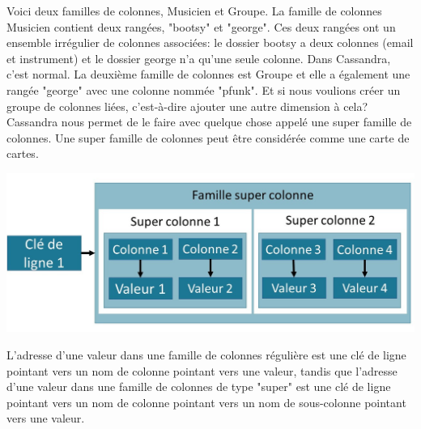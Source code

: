\documentclass[12pt, letterpaper]{report}
\begin{document}
Voici deux familles de colonnes, Musicien et Groupe. La famille de colonnes Musicien contient deux rangées, "bootsy" et "george". Ces deux rangées ont un ensemble irrégulier de colonnes associées: le dossier bootsy a deux colonnes (email et instrument) et le dossier george n'a qu'une seule colonne. Dans Cassandra, c'est normal. La deuxième famille de colonnes est Groupe et elle a également une rangée "george" avec une colonne nommée "pfunk".
\newline
Et si nous voulions créer un groupe de colonnes liées, c'est-à-dire ajouter une autre dimension à cela? Cassandra nous permet de le faire avec quelque chose appelé une super famille de colonnes. Une super famille de colonnes peut être considérée comme une carte de cartes.

\begin{center}
	\includegraphics[width=\textwidth]{supercolumnfam}
\end{center}

L'adresse d'une valeur dans une famille de colonnes régulière est une clé de ligne pointant vers un nom de colonne pointant vers une valeur, tandis que l'adresse d'une valeur dans une famille de colonnes de type "super" est une clé de ligne pointant vers un nom de colonne pointant vers un nom de sous-colonne pointant vers une valeur. 
\newline
\end{document}
